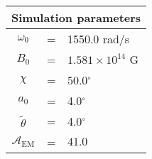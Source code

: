 \begin{tabular}{ccl}
\multicolumn{3}{c}{Simulation parameters} \\
\hline
$\omega_0$  &=& 1550.0 rad/s\\
$B_0$  &=& ${1.581}\times 10^{14}$ G \\
$\chi$  &=& 50.0$^{\circ}$ \\
$a_0$ &=& 4.0$^{\circ}$ \\
$\tilde{\theta}$ &= & 4.0$^{\circ}$ \\
$\mathcal{A}_{\mathrm{EM}}$ &= & $41.0$
\end{tabular}
